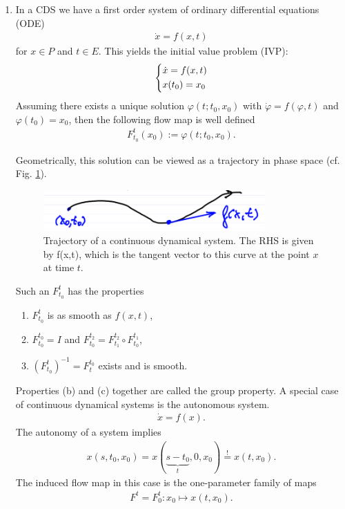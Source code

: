 \begin{enumerate}
\item In a CDS we have a first order system of ordinary differential equations (ODE)
	\begin{align}
		\boxed{
			\dot{ {x}} = f( {x},t)
		}
	\end{align}
	for $ {x}\in P$ and $t \in E$. This yields the initial value problem (IVP):
	\begin{align}
		\begin{dcases}
			\dot{ {x}} = f( {x},t) \\
			 {x}(t_0) =  {x}_0
		\end{dcases}
	\end{align}
	Assuming there exists a unique solution $\varphi(t; t_0,  {x}_0)$ with $\dot{\varphi} = f(\varphi,t)$ and $\varphi(t_0)=  {x}_0$, then the following flow map is well defined
	\begin{align}
		\boxed{
		F_{t_0}^{t}( {x}_0) := \varphi(t; t_0,  {x}_0).}
	\end{align}

Geometrically, this solution can be viewed as a trajectory in phase space (cf. Fig. \ref{fig:cds_traj}).
	\begin{figure}[h!]
	\centering
	\includegraphics[width = 0.8\textwidth]{figures/intro/2CDS.png}
	\caption{Trajectory of a continuous dynamical system. The RHS is given by f(x,t), which is the tangent vector to this curve at the point $x$ at time $t$.} \label{fig:cds_traj}
	\end{figure}
	
	Such an $F_{t_0}^{t}$ has the properties
	\begin{enumerate}
		\item $F_{t_0}^{t}$ is as smooth as $f( {x},t)$,
		\item $F_{t_0}^{t_0} = I$ and $F_{t_0}^{t_2} = F_{t_1}^{t_2} \circ F_{t_0}^{t_1}$,
		\item $\left(F_{t_0}^{t}\right)^{-1} = F_{t}^{t_0}$ exists and is smooth.
\end{enumerate}
Properties (b) and (c) together are called the group property. A special case of continuous dynamical systems is the autonomous system.
\begin{align}
	\boxed{\dot{ {x}} = f( {x}).}	
\end{align}
The autonomy of a system implies
\begin{align}
	 {x}(s,t_0,  {x}_0) =  {x}(\underbrace{s-t_0}_{t}, 0,  {x}_0) \stackrel{!}{=}  {x}(t, {x}_0).
\end{align}
The induced flow map in this case is the one-parameter family of maps
\begin{align}
	\boxed{ F^{t} = F_{0}^{t}:  {x}_0 \mapsto  {x}(t, {x}_0).}
\end{align}

\end{enumerate}
